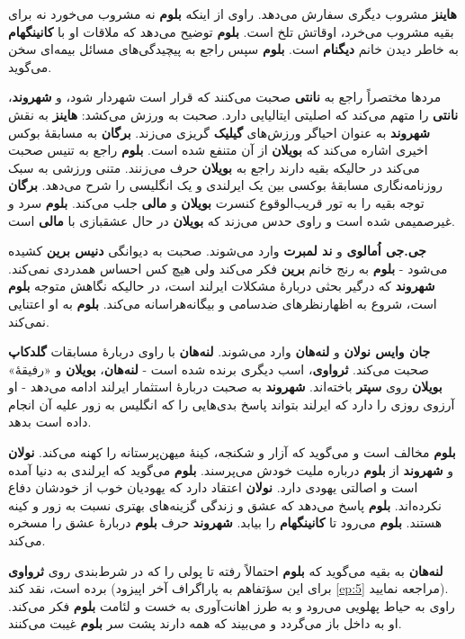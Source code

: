 \documentclass[12pt]{book}
\newcommand{\noun}[1]{{\textbf{#1}}}
\begin{document}
    \noun{هاینز} مشروب دیگری سفارش می‌دهد. راوی از اینکه \noun{بلوم} نه مشروب می‌خورد نه برای بقیه مشروب می‌خرد، اوقاتش تلخ است. \noun{بلوم} توضیح می‌دهد که ملاقات او با \noun{کانینگهام} به خاطر دیدن خانم \noun{دیگنام} است. \noun{بلوم} سپس راجع به پیچیدگی‌های مسائل بیمه‌ای سخن می‌گوید.

    مردها مختصراً راجع به \noun{نانتی} صحبت می‌کنند که قرار است شهردار شود، و \noun{شهروند‬}، \noun{نانتی} را متهم می‌کند که اصلیتی ایتالیایی دارد. صحبت به ورزش می‌کشد: \noun{هاینز} به نقش \noun{شهروند‬} به عنوان احیاگر ورزش‌های \noun{گیلیک} گریزی می‌زند. \noun{برگان} به مسابقهٔ بوکس اخیری اشاره می‌کند که \noun{بویلان} از آن متنفع شده است. \noun{بلوم} راجع به تنیس صحبت می‌کند در حالیکه بقیه دارند راجع به \noun{بویلان} حرف می‌زنند. متنی ورزشی به سبک روزنامه‌نگاری مسابقهٔ بوکسی بین یک ایرلندی و یک انگلیسی را شرح می‌دهد. \noun{برگان} توجه بقیه را به تور قریب‌الوقوع کنسرت \noun{بویلان} و \noun{مالی} جلب می‌کند. \noun{بلوم} سرد و غیرصمیمی شده است و راوی حدس می‌زند که \noun{بویلان} در حال عشقبازی با \noun{مالی} است.

    \noun{جی.جی اُمالوی} و \noun{ند لمبرت} وارد می‌شوند. صحبت به دیوانگی \noun{دنیس برین} کشیده می‌شود - \noun{بلوم} به رنج خانم \noun{برین} فکر می‌کند ولی هیچ کس احساس همدردی نمی‌کند. \noun{شهروند‬} که درگیر بحثی دربارهٔ مشکلات ایرلند است، در حالیکه نگاهش متوجه \noun{بلوم} است، شروع به اظهارنظرهای ضدسامی و بیگانه‌هراسانه می‌کند. \noun{بلوم} به او اعتنایی نمی‌کند.

    \noun{جان وایس نولان} و \noun{لنه‌هان} وارد می‌شوند. \noun{لنه‌هان} با راوی دربارهٔ مسابقات \noun{گلدکاپ} صحبت می‌کند. \noun{ثرواوی}، اسب دیگری برنده شده است - \noun{لنه‌هان}، \noun{بویلان} و «رفیقهٔ» \noun{بویلان} روی \noun{سپتر} باخته‌اند. \noun{شهروند‬} به صحبت دربارهٔ استثمار ایرلند ادامه می‌دهد - او آرزوی روزی را دارد که ایرلند بتواند پاسخ بدی‌هایی را که انگلیس به زور علیه آن انجام داده است بدهد.

    \noun{بلوم} مخالف است و می‌گوید که آزار و شکنجه، کینهٔ میهن‌پرستانه را کهنه می‌کند. \noun{نولان} و \noun{شهروند‬} از \noun{بلوم} درباره ملیت خودش می‌پرسند. \noun{بلوم} می‌گوید که ایرلندی به دنیا آمده است و اصالتی یهودی دارد. \noun{نولان} اعتقاد دارد که یهودیان خوب از خودشان دفاع نکرده‌اند. \noun{بلوم} پاسخ می‌دهد که عشق و زندگی گزینه‌های بهتری نسبت به زور و کینه هستند. \noun{بلوم} می‌رود تا \noun{کانینگهام} را بیابد. \noun{شهروند‬} حرف \noun{بلوم} دربارهٔ عشق را مسخره می‌کند.

   \noun{لنه‌هان} به بقیه می‌گوید که \noun{بلوم} احتمالاً رفته تا پولی را که در شرط‌بندی روی \noun{ثرواوی} برده است، نقد کند (برای این سؤتفاهم به پاراگراف آخر اپیزود \ref{ep:5} مراجعه نمایید). راوی به حیاط پهلویی می‌رود و به طرز اهانت‌آوری به خست و لئامت \noun{بلوم} فکر می‌کند. او به داخل باز می‌گردد و می‌بیند که همه دارند پشت سر \noun{بلوم} غیبت می‌کنند.
\end{document}
